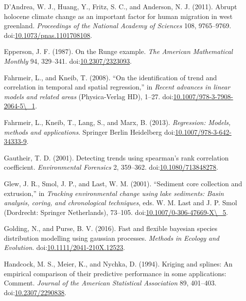 \documentclass[12pt,]{article}
\begin{document}
\hypertarget{ref-DAndrea2011-oa}{}
D'Andrea, W. J., Huang, Y., Fritz, S. C., and Anderson, N. J. (2011).
Abrupt holocene climate change as an important factor for human
migration in west greenland. \emph{Proceedings of the National Academy
of Sciences} 108, 9765--9769.
doi:\href{https://doi.org/10.1073/pnas.1101708108}{10.1073/pnas.1101708108}.

\hypertarget{ref-Epperson1987-ui}{}
Epperson, J. F. (1987). On the Runge example. \emph{The American
Mathematical Monthly} 94, 329--341.
doi:\href{https://doi.org/10.2307/2323093}{10.2307/2323093}.

\hypertarget{ref-Fahrmeir2008-si}{}
Fahrmeir, L., and Kneib, T. (2008). ``On the identification of trend and
correlation in temporal and spatial regression,'' in \emph{Recent
advances in linear models and related areas} (Physica-Verlag HD), 1--27.
doi:\href{https://doi.org/10.1007/978-3-7908-2064-5/_1}{10.1007/978-3-7908-2064-5\textbackslash{}\_1}.

\hypertarget{ref-Fahrmeir2013-xu}{}
Fahrmeir, L., Kneib, T., Lang, S., and Marx, B. (2013).
\emph{Regression: Models, methods and applications}. Springer Berlin
Heidelberg
doi:\href{https://doi.org/10.1007/978-3-642-34333-9}{10.1007/978-3-642-34333-9}.

\hypertarget{ref-Gautheir2001-ee}{}
Gautheir, T. D. (2001). Detecting trends using spearman's rank
correlation coefficient. \emph{Environmental Forensics} 2, 359--362.
doi:\href{https://doi.org/10.1080/713848278}{10.1080/713848278}.

\hypertarget{ref-Glew2001-co}{}
Glew, J. R., Smol, J. P., and Last, W. M. (2001). ``Sediment core
collection and extrusion,'' in \emph{Tracking environmental change using
lake sediments: Basin analysis, coring, and chronological techniques},
eds. W. M. Last and J. P. Smol (Dordrecht: Springer Netherlands),
73--105.
doi:\href{https://doi.org/10.1007/0-306-47669-X/_5}{10.1007/0-306-47669-X\textbackslash{}\_5}.

\hypertarget{ref-Golding2016-bb}{}
Golding, N., and Purse, B. V. (2016). Fast and flexible bayesian species
distribution modelling using gaussian processes. \emph{Methods in
Ecology and Evolution}.
doi:\href{https://doi.org/10.1111/2041-210X.12523}{10.1111/2041-210X.12523}.

\hypertarget{ref-Handcock1994-lj}{}
Handcock, M. S., Meier, K., and Nychka, D. (1994). Kriging and splines:
An empirical comparison of their predictive performance in some
applications: Comment. \emph{Journal of the American Statistical
Association} 89, 401--403.
doi:\href{https://doi.org/10.2307/2290838}{10.2307/2290838}.
\end{document}
